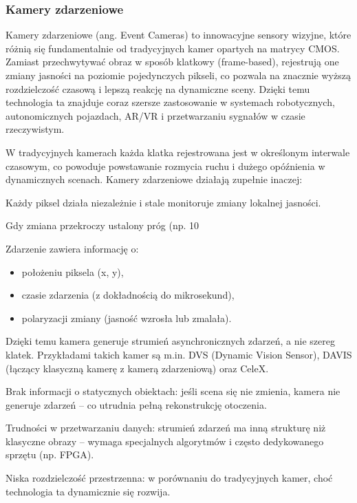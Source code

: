 \documentclass[magisterska]{pracadypl}
\begin{document}
\subsubsection*{Kamery zdarzeniowe}

Kamery zdarzeniowe (ang. Event Cameras) to innowacyjne sensory wizyjne, które różnią się fundamentalnie od tradycyjnych kamer opartych na matrycy CMOS. Zamiast przechwytywać obraz w sposób klatkowy (frame-based), rejestrują one zmiany jasności na poziomie pojedynczych pikseli, co pozwala na znacznie wyższą rozdzielczość czasową i lepszą reakcję na dynamiczne sceny. Dzięki temu technologia ta znajduje coraz szersze zastosowanie w systemach robotycznych, autonomicznych pojazdach, AR/VR i przetwarzaniu sygnałów w czasie rzeczywistym.

W tradycyjnych kamerach każda klatka rejestrowana jest w określonym interwale czasowym, co powoduje powstawanie rozmycia ruchu i dużego opóźnienia w dynamicznych scenach. Kamery zdarzeniowe działają zupełnie inaczej:

Każdy piksel działa niezależnie i stale monitoruje zmiany lokalnej jasności.

Gdy zmiana przekroczy ustalony próg (np. 10%

Zdarzenie zawiera informację o:

\begin{itemize}
  \item położeniu piksela (x, y),

  \item czasie zdarzenia (z dokładnością do mikrosekund),

  \item polaryzacji zmiany (jasność wzrosła lub zmalała).
\end{itemize}

Dzięki temu kamera generuje strumień asynchronicznych zdarzeń, a nie szereg klatek. Przykładami takich kamer są m.in. DVS (Dynamic Vision Sensor), DAVIS (łączący klasyczną kamerę z kamerą zdarzeniową) oraz CeleX.

Brak informacji o statycznych obiektach: jeśli scena się nie zmienia, kamera nie generuje zdarzeń – co utrudnia pełną rekonstrukcję otoczenia.

Trudności w przetwarzaniu danych: strumień zdarzeń ma inną strukturę niż klasyczne obrazy – wymaga specjalnych algorytmów i często dedykowanego sprzętu (np. FPGA).

Niska rozdzielczość przestrzenna: w porównaniu do tradycyjnych kamer, choć technologia ta dynamicznie się rozwija.
\end{document}
